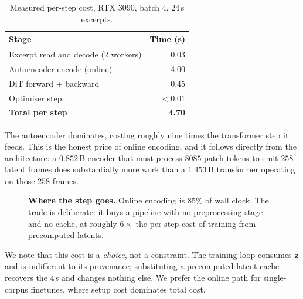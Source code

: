 \documentclass[10pt,twocolumn,letterpaper]{article}
\newcommand{\bz}{\mathbf{z}}
\begin{document}
\begin{table}[t]
\centering
\small
\begin{tabular}{lr}
\toprule
Stage & Time (s) \\
\midrule
Excerpt read and decode (2 workers) & 0.03 \\
Autoencoder encode (online) & 4.00 \\
DiT forward + backward & 0.45 \\
Optimiser step & $<0.01$ \\
\midrule
\textbf{Total per step} & \textbf{4.70} \\
\bottomrule
\end{tabular}
\caption{Measured per-step cost, RTX 3090, batch 4, 24\,s excerpts.}
\label{tab:cost}
\end{table}

The autoencoder dominates, costing roughly nine times the transformer step it feeds.
This is the honest price of online encoding, and it follows directly from the
architecture: a $0.852$\,B encoder that must process $8085$ patch tokens to emit $258$
latent frames does substantially more work than a $1.453$\,B transformer operating on
those $258$ frames.

\begin{figure}[t]
\centering
{}
\caption{\textbf{Where the step goes.} Online encoding is $85\%$ of wall clock. The
trade is deliberate: it buys a pipeline with no preprocessing stage and no cache, at
roughly $6\times$ the per-step cost of training from precomputed latents.}
\label{fig:steptime}
\end{figure}

We note that this cost is a \emph{choice}, not a constraint. The training loop consumes
$\bz$ and is indifferent to its provenance; substituting a precomputed latent cache
recovers the $4$\,s and changes nothing else. We prefer the online path for
single-corpus finetunes, where setup cost dominates total cost.
\end{document}
